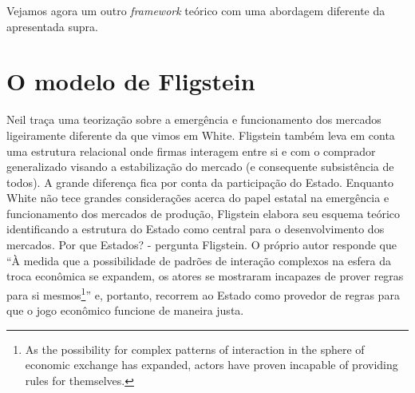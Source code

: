 \documentclass[a4paper, 12pt, openright, oneside, german, french, english, brazil]{abntex2}
\begin{document}
	
	
	
	
	
	
	
	
	
	
	
	

	Vejamos agora um outro \textit{framework} teórico com uma abordagem diferente da apresentada supra.

	\section{O modelo de Fligstein}

	Neil  traça uma teorização sobre a emergência e funcionamento dos mercados ligeiramente diferente da que vimos em White. Fligstein também leva em conta uma estrutura relacional onde firmas interagem entre si e com o comprador generalizado visando a estabilização do mercado (e consequente subsistência de todos). A grande diferença fica por conta da participação do Estado. Enquanto White não tece grandes considerações acerca do papel estatal na emergência e funcionamento dos mercados de produção, Fligstein elabora seu esquema teórico identificando a estrutura do Estado como central para o desenvolvimento dos mercados. Por que Estados? - pergunta Fligstein. O próprio autor responde que ``À medida que a possibilidade de padrões de interação complexos na esfera da troca econômica se expandem, os atores se mostraram incapazes de prover regras para si mesmos\footnote{As the possibility for complex patterns of interaction in the sphere of economic exchange has expanded, actors have proven incapable of providing rules for themselves.}'' \cite[p. 27-8]{fligstein2002architecture} e, portanto, recorrem ao Estado como provedor de regras para que o jogo econômico funcione de maneira justa.
\end{document}
